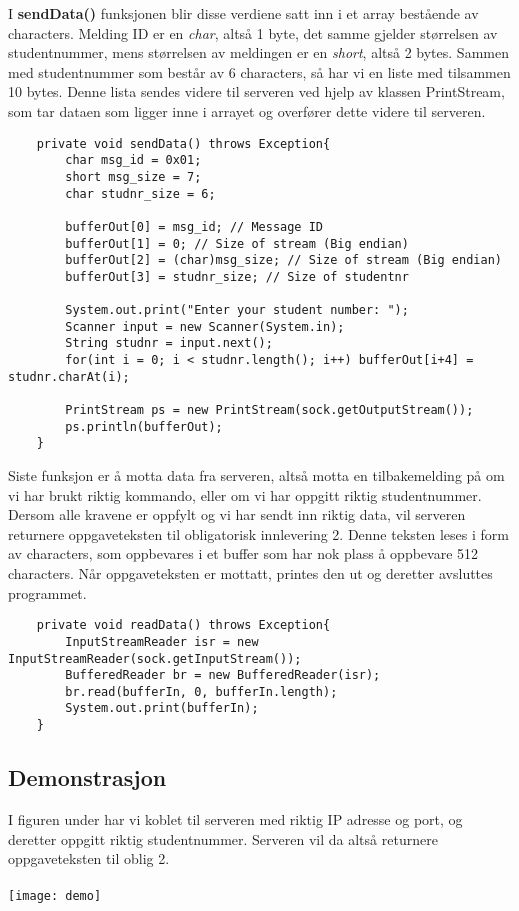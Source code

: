 I \textbf{sendData()} funksjonen blir disse verdiene satt inn i et array bestående av characters. Melding ID er en \textit{char}, altså 1 byte, det samme gjelder størrelsen av studentnummer, mens størrelsen av meldingen er en \textit{short}, altså 2 bytes. Sammen med studentnummer som består av 6 characters, så har vi en liste med tilsammen 10 bytes. Denne lista sendes videre til serveren ved hjelp av klassen PrintStream, som tar dataen som ligger inne i arrayet og overfører dette videre til serveren.
\begin{lstlisting}
	private void sendData() throws Exception{
		char msg_id = 0x01;
		short msg_size = 7;
		char studnr_size = 6;

		bufferOut[0] = msg_id; // Message ID
		bufferOut[1] = 0; // Size of stream (Big endian)
		bufferOut[2] = (char)msg_size; // Size of stream (Big endian)
		bufferOut[3] = studnr_size; // Size of studentnr
		
		System.out.print("Enter your student number: ");
		Scanner input = new Scanner(System.in);
		String studnr = input.next();
		for(int i = 0; i < studnr.length(); i++) bufferOut[i+4] = studnr.charAt(i);
		
		PrintStream ps = new PrintStream(sock.getOutputStream());
		ps.println(bufferOut);
	}
\end{lstlisting}

Siste funksjon er å motta data fra serveren, altså motta en tilbakemelding på om vi har brukt riktig kommando, eller om vi har oppgitt riktig studentnummer. Dersom alle kravene er oppfylt og vi har sendt inn riktig data, vil serveren returnere oppgaveteksten til obligatorisk innlevering 2. Denne teksten leses i form av characters, som oppbevares i et buffer som har nok plass å oppbevare 512 characters. Når oppgaveteksten er mottatt, printes den ut og deretter avsluttes programmet.
\begin{lstlisting}
	private void readData() throws Exception{
		InputStreamReader isr = new InputStreamReader(sock.getInputStream());
		BufferedReader br = new BufferedReader(isr);
		br.read(bufferIn, 0, bufferIn.length);
		System.out.print(bufferIn);
	}
\end{lstlisting}

\subsection{Demonstrasjon}
I figuren under har vi koblet til serveren med riktig IP adresse og port, og deretter oppgitt riktig studentnummer. Serveren vil da altså returnere oppgaveteksten til oblig 2.\\\\
\texttt{[image: demo]}
